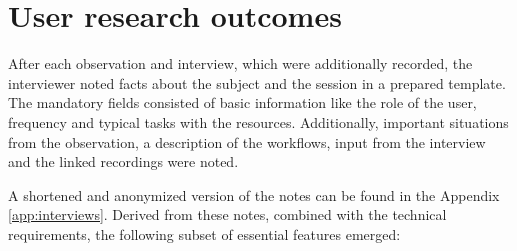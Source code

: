 \section{User research outcomes}
\label{sec:research-outcomes}
After each observation and interview, which were additionally recorded, the interviewer noted facts about the subject and the session in a prepared template.
The mandatory fields consisted of basic information like the role of the user, frequency and typical tasks with the resources.
Additionally, important situations from the observation, a description of the workflows, input from the interview and the linked recordings were noted.

A shortened and anonymized version of the notes can be found in the Appendix \ref{app:interviews}.
Derived from these notes, combined with the technical requirements, the following subset of essential features emerged:

